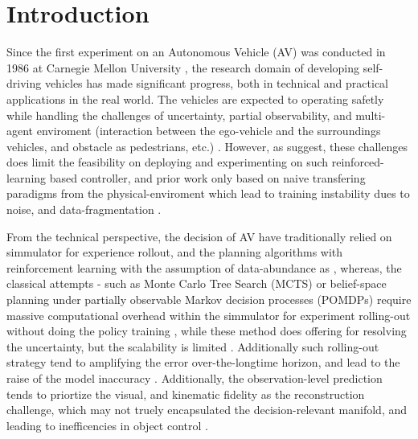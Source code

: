 \section{Introduction}
\label{sec:introduction}

Since the first experiment on an Autonomous Vehicle (AV) was conducted in 1986 at Carnegie Mellon University \cite{hacohen_2022_autonomous}, the research domain of developing self-driving vehicles has made significant progress, both in technical and practical applications in the real world. The vehicles are expected to operating safetly while handling the challenges of uncertainty, partial observability, and multi-agent enviroment (interaction between the ego-vehicle and the surroundings vehicles, and obstacle as pedestrians, etc.) \cite{jia_2023_adriveri, zhang_2024_bevworld}. However, as \cite{dulacarnold_2019_challenges} suggest, these challenges does limit the feasibility on deploying and experimenting on such reinforced-learning based controller, and prior work only based on naive transfering paradigms from the physical-enviroment which lead to training instability dues to noise, and data-fragmentation \cite{dulacarnold_2019_challenges, Jia2025, Chen2025}.

From the technical perspective, the decision of AV have traditionally relied on simmulator for experience rollout, and the planning algorithms with reinforcement learning with the assumption of data-abundance as \cite{hessel_2017_rainbow, hoel_2019_combining}, whereas, the classical attempts - such as Monte Carlo Tree Search (MCTS) or belief-space planning under partially observable Markov decision processes (POMDPs) require massive computational overhead within the simmulator for experiment rolling-out without doing the policy training \cite{han_2024_a, morimura_2024_policy, huang_2024_learning}, while these method does offering for resolving the uncertainty, but the scalability is limited \cite{momchil_2025_treeirl}. Additionally such rolling-out strategy tend to amplifying the error over-the-longtime horizon, and lead to the raise of the model inaccuracy \cite{robine_2020_smaller, xiao_2019_learning}. Additionally, the observation-level prediction tends to priortize the visual, and kinematic fidelity as the reconstruction challenge, which may not truely encapsulated the decision-relevant manifold, and leading to inefficencies in object control \cite{sobal_2022_separating, Assran2025, LeCun2022}.

